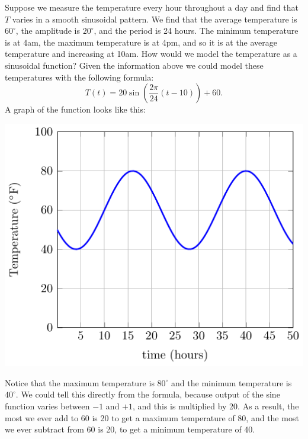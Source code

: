 % 
% 
% 
% 
\bex
Suppose we measure the temperature every hour throughout a day and find that $T$ varies in
a smooth sinusoidal pattern.  We find that the average temperature is $60^\circ$, the
amplitude is $20^\circ$, and the period is 24 hours.  The minimum temperature is at 4am,
the maximum temperature is at 4pm, and so it is at the average temperature and increasing
at 10am.  How would we model the temperature as a sinusoidal function?
\eex
Given the information above we could model these temperatures with the following formula:
\[ T(t) = 20 \sin \left( \frac{2 \pi}{24} (t - 10) \right) + 60. \]
A graph of the function looks like this:
\begin{center}
    \includegraphics[width=0.5\columnwidth]{figures/0-5-fig8.pdf}
\end{center}
% 
Notice that the maximum temperature is $80^\circ$ and the minimum temperature is
$40^\circ$.  We could tell this directly from the formula, because output of the sine
function varies between $-1$ and $+1$, and this is multiplied by 20.  As a result, the
most we ever add to 60 is 20 to get a maximum temperature of 80, and the most we ever
subtract from 60 is 20, to get a minimum temperature of 40.

